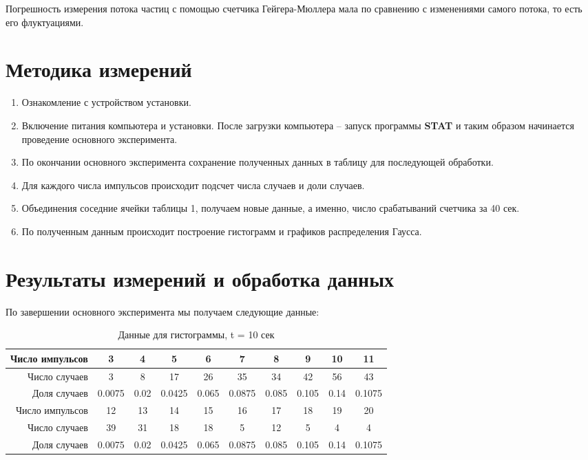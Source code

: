 \documentclass[a4paper, 12pt]{article}
\begin{document}
Погрешность измерения потока частиц с помощью счетчика Гейгера-Мюллера мала по сравнению с изменениями самого потока, то есть его флуктуациями.

\section {Методика измерений} 
\begin{enumerate}
	\item Ознакомление с устройством установки. 
	\item Включение питания компьютера и установки. После загрузки компьютера -- запуск программы \textbf{STAT} и таким образом начинается проведение основного эксперимента.  
	\item По окончании основного эксперимента сохранение полученных данных в таблицу для последующей обработки. 
	\item Для каждого числа импульсов происходит подсчет числа случаев и доли случаев.  
	\item Объединения соседние ячейки таблицы 1, получаем новые данные, а именно, число срабатываний счетчика за 40 сек.  
	\item По полученным данным происходит построение гистограмм и графиков распределения Гаусса. 
\end{enumerate}

\section {Результаты измерений и обработка данных}
По завершении основного эксперимента мы получаем следующие данные:

\begin{table}[H]
	\centering
	\begin{tabular}{|r|c|c|c|c|c|c|c|c|c|}
		\hline
		Число импульсов & 3 & 4 & 5 & 6 & 7 & 8 & 9 & 10 & 11 \\ \hline
		
		Число случаев & 3 & 8 & 17 & 26 & 35 & 34 & 42 & 56 & 43 \\ \hline  
		
		Доля случаев & 0.0075 & 0.02 & 0.0425 & 0.065 & 0.0875 & 0.085 & 0.105 & 0.14 & 0.1075 \\ \hline 	
		
		Число импульсов & 12 & 13 & 14 & 15 & 16 & 17 & 18 & 19 & 20 \\ \hline
		
		Число случаев & 39 & 31 & 18 & 18 & 5 & 12 & 5 & 4 & 4 \\ \hline  
		
		Доля случаев & 0.0075 & 0.02 & 0.0425 & 0.065 & 0.0875 & 0.085 & 0.105 & 0.14 & 0.1075 \\ \hline 	
	\end{tabular}
	\caption{Данные для гистограммы, t = 10 сек}	
\end{table}
\end{document}
